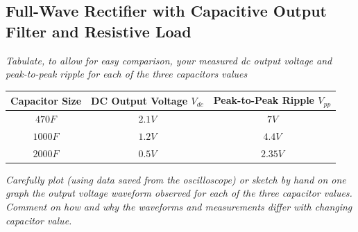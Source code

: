 \documentclass[12pt,a4paper]{article}
\begin{document}
\subsection{Full-Wave Rectifier with Capacitive Output Filter and Resistive Load}
\textit{Tabulate, to allow for easy comparison, your measured dc output voltage and peak-to-peak ripple for each of the three capacitors values}\\

\begin{center}
	\begin{tabular}{|c|c|c|}
		\hline
		\centering\textbf{Capacitor Size} & \centering\textbf{DC Output Voltage $V_{dc}$} &\centering\textbf{Peak-to-Peak Ripple $V_{pp}$}\tabularnewline 
		\hline
		$470 F$ & $2.1V$ & $7V$ \\
		\hline
		$1000 F$ & $1.2V$ & $4.4V$\\
		\hline
		$2000 F$ & $0.5V$ & $2.35V$\\
		\hline
	\end{tabular}
\end{center}

\textit{Carefully plot (using data saved from the oscilloscope) or sketch by hand on one graph the output voltage waveform observed for each of the three capacitor values. Comment on how and why the
waveforms and measurements differ with changing capacitor value.}\\
\end{document}
